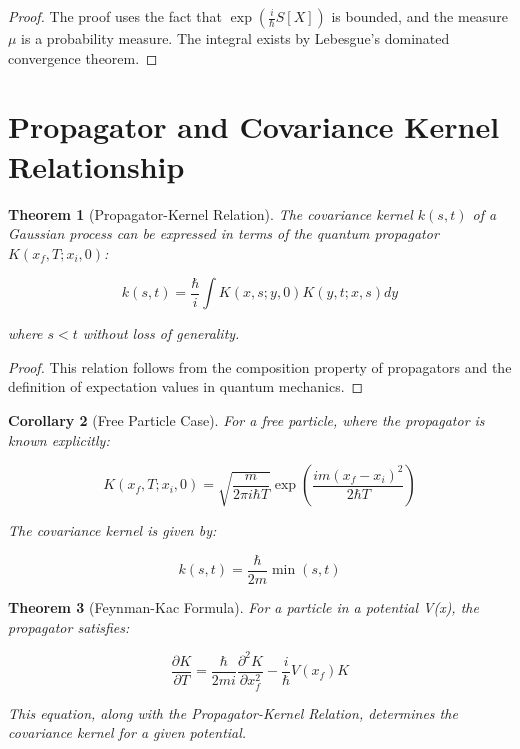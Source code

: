 \documentclass{article}
\newtheorem{theorem}{Theorem}
\newtheorem{corollary}[theorem]{Corollary}
\begin{document}
\begin{proof}
The proof uses the fact that $\exp(\frac{i}{\hbar}S[X])$ is bounded, and the measure $\mu$ is a probability measure. The integral exists by Lebesgue's dominated convergence theorem.
\end{proof}

\section{Propagator and Covariance Kernel Relationship}

\begin{theorem}[Propagator-Kernel Relation]
The covariance kernel $k(s,t)$ of a Gaussian process can be expressed in terms of the quantum propagator $K(x_f, T; x_i, 0)$:

\begin{equation}
    k(s,t) = \frac{\hbar}{i} \int K(x, s; y, 0) K(y, t; x, s) dy
\end{equation}

where $s < t$ without loss of generality.
\end{theorem}

\begin{proof}
This relation follows from the composition property of propagators and the definition of expectation values in quantum mechanics.
\end{proof}

\begin{corollary}[Free Particle Case]
For a free particle, where the propagator is known explicitly:

\begin{equation}
    K(x_f, T; x_i, 0) = \sqrt{\frac{m}{2\pi i\hbar T}} \exp\left(\frac{im(x_f - x_i)^2}{2\hbar T}\right)
\end{equation}

The covariance kernel is given by:

\begin{equation}
    k(s,t) = \frac{\hbar}{2m} \min(s,t)
\end{equation}
\end{corollary}

\begin{theorem}[Feynman-Kac Formula]
For a particle in a potential V(x), the propagator satisfies:

\begin{equation}
    \frac{\partial K}{\partial T} = \frac{\hbar}{2mi} \frac{\partial^2 K}{\partial x_f^2} - \frac{i}{\hbar}V(x_f)K
\end{equation}

This equation, along with the Propagator-Kernel Relation, determines the covariance kernel for a given potential.
\end{theorem}
\end{document}
